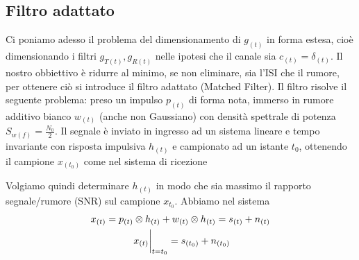     \subsection{Filtro adattato}
        Ci poniamo adesso il problema del dimensionamento di $g_{(t)}$ in forma estesa, cioè
        dimensionando i filtri $g_{T(t)},g_{R(t)}$ nelle ipotesi che il canale sia $c_{(t)} = \delta_{(t)}$. 
        Il nostro obbiettivo è ridurre al minimo, se non eliminare, sia l'ISI che il rumore, per ottenere ciò si introduce
        il filtro adattato (Matched Filter). Il filtro risolve il seguente problema: preso un impulso $p_{(t)}$ di forma nota,
        immerso in rumore additivo bianco $w_{(t)}$ (anche non Gaussiano) con densità spettrale di potenza $S_{w(f)} = \frac{N_0}{2}$. 
        Il segnale è inviato in ingresso ad un sistema lineare e tempo invariante con risposta impulsiva $h_{(t)}$ e campionato ad un 
        istante $t_{0}$, ottenendo il campione $x_{(t_0)}$ come nel sistema di ricezione
        \begin{figure}[H]
            \centering
        \end{figure}        
        Volgiamo quindi determinare $h_{(t)}$ in modo che sia massimo il rapporto segnale/rumore (SNR) sul campione $x_{t_0}$. Abbiamo 
        nel sistema
        \begin{gather}
            x_{(t)} = p_{(t)}\otimes h_{(t)}+w_{(t)}\otimes h_{(t)} = s_{(t)}+ n_{(t)}\nonumber \\
            \eval*{x_{(t)}}_{t=t_0} = s_{(t_0)} + n_{(t_0)}\nonumber
        \end{gather}
